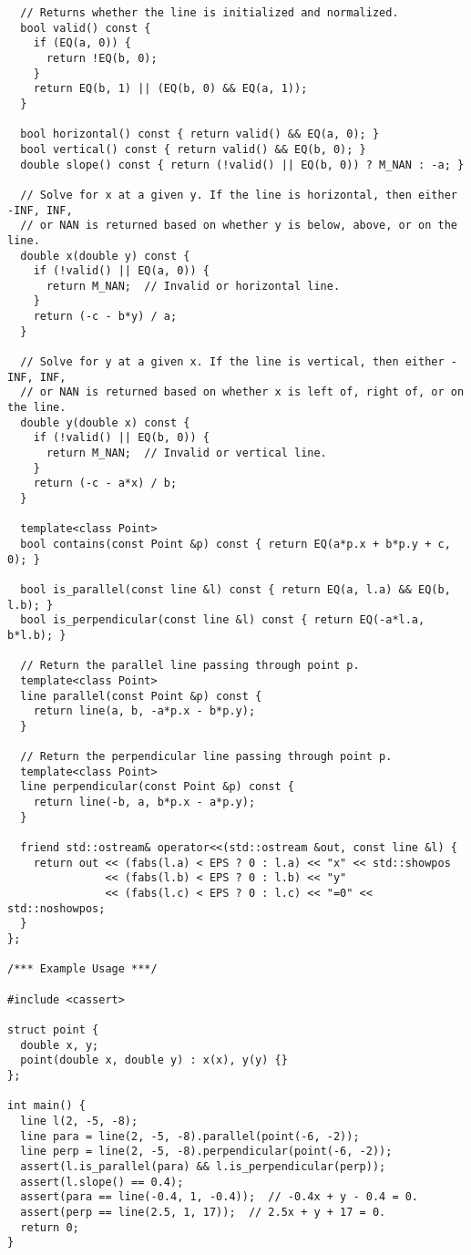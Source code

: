 \begin{lstlisting}
  // Returns whether the line is initialized and normalized.
  bool valid() const {
    if (EQ(a, 0)) {
      return !EQ(b, 0);
    }
    return EQ(b, 1) || (EQ(b, 0) && EQ(a, 1));
  }

  bool horizontal() const { return valid() && EQ(a, 0); }
  bool vertical() const { return valid() && EQ(b, 0); }
  double slope() const { return (!valid() || EQ(b, 0)) ? M_NAN : -a; }

  // Solve for x at a given y. If the line is horizontal, then either -INF, INF,
  // or NAN is returned based on whether y is below, above, or on the line.
  double x(double y) const {
    if (!valid() || EQ(a, 0)) {
      return M_NAN;  // Invalid or horizontal line.
    }
    return (-c - b*y) / a;
  }

  // Solve for y at a given x. If the line is vertical, then either -INF, INF,
  // or NAN is returned based on whether x is left of, right of, or on the line.
  double y(double x) const {
    if (!valid() || EQ(b, 0)) {
      return M_NAN;  // Invalid or vertical line.
    }
    return (-c - a*x) / b;
  }

  template<class Point>
  bool contains(const Point &p) const { return EQ(a*p.x + b*p.y + c, 0); }

  bool is_parallel(const line &l) const { return EQ(a, l.a) && EQ(b, l.b); }
  bool is_perpendicular(const line &l) const { return EQ(-a*l.a, b*l.b); }

  // Return the parallel line passing through point p.
  template<class Point>
  line parallel(const Point &p) const {
    return line(a, b, -a*p.x - b*p.y);
  }

  // Return the perpendicular line passing through point p.
  template<class Point>
  line perpendicular(const Point &p) const {
    return line(-b, a, b*p.x - a*p.y);
  }

  friend std::ostream& operator<<(std::ostream &out, const line &l) {
    return out << (fabs(l.a) < EPS ? 0 : l.a) << "x" << std::showpos
               << (fabs(l.b) < EPS ? 0 : l.b) << "y"
               << (fabs(l.c) < EPS ? 0 : l.c) << "=0" << std::noshowpos;
  }
};

/*** Example Usage ***/

#include <cassert>

struct point {
  double x, y;
  point(double x, double y) : x(x), y(y) {}
};

int main() {
  line l(2, -5, -8);
  line para = line(2, -5, -8).parallel(point(-6, -2));
  line perp = line(2, -5, -8).perpendicular(point(-6, -2));
  assert(l.is_parallel(para) && l.is_perpendicular(perp));
  assert(l.slope() == 0.4);
  assert(para == line(-0.4, 1, -0.4));  // -0.4x + y - 0.4 = 0.
  assert(perp == line(2.5, 1, 17));  // 2.5x + y + 17 = 0.
  return 0;
}
\end{lstlisting}
